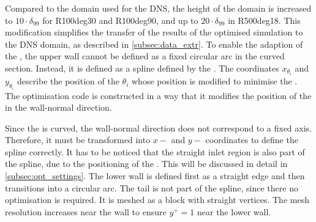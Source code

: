 Compared to the domain used for the DNS, the height of the domain is increased to $10 \cdot \delta_{99}$ for R100deg30 and R100deg90, and up to $20 \cdot \delta_{99}$ in R500deg18.
This modification simplifies the transfer of the results of the optimised  simulation to the DNS domain, as  described in \autoref{subsec:data_extr}.
To enable the adaption of the , the upper wall cannot be defined as a fixed circular arc in the curved section.
Instead, it is defined as a spline defined by the .
The coordinates $x_{\theta_i}$ and $y_{\theta_i}$  describe the position of the  $\theta_i$ whose position is modified to minimise the .  
The optimisation code is constructed in a way that it modifies the position of the  in the wall-normal direction. 


Since the  is curved, the wall-normal direction does not correspond to a fixed axis. 
Therefore,  it must be transformed into  $x-$ and $y-$ coordinates to  define the spline correctly.
It has to be noticed that the straight inlet region is also part of the spline, due to the positioning of the .
This will be discussed in detail in \autoref{subsec:opt_settings}.
The lower wall is defined first as a straight edge  and then transitions into a circular arc.
The tail is not part of the spline, since there no optimisation is required.
It is meshed as a block with straight vertices.
The mesh resolution increases near the wall to ensure $y^+ = 1$ near the lower wall.





